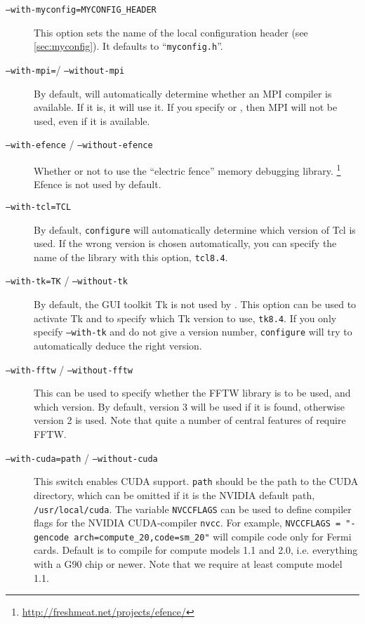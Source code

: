 \begin{description}
\item[\texttt{--with-myconfig=MYCONFIG\_HEADER}] This option sets the
  name of the local configuration header (see \vref{sec:myconfig}). It
  defaults to ``\texttt{myconfig.h}''.
\item[\texttt{--with-mpi=}/ \texttt{--without-mpi}] By default,
   will automatically determine whether an MPI
  compiler is available.  If it is, it will use it.  If you specify
   or , then MPI will
  not be used, even if it is available.
\item[\texttt{--with-efence} / \texttt{--without-efence}] Whether or
  not to use the ``electric fence'' memory debugging library.
  \footnote{\url{http://freshmeat.net/projects/efence/}} Efence is not
  used by default.
\item[\texttt{--with-tcl=TCL}] By default, \texttt{configure} will
  automatically determine which version of Tcl is used.  If the wrong
  version is chosen automatically, you can specify the name of the
  library with this option, \eg \texttt{tcl8.4}.
\item[\texttt{--with-tk=TK} / \texttt{--without-tk}] By default, the
  GUI toolkit Tk is not used by \es. This option can be used to
  activate Tk and to specify which Tk version to use, \eg{}
  \texttt{tk8.4}. If you only specify \texttt{--with-tk} and do not
  give a version number, \texttt{configure} will try to automatically
  deduce the right version.
\item[\texttt{--with-fftw} / \texttt{--without-fftw}] This can
  be used to specify whether the FFTW library is to be used, and which
  version.  By default, version 3 will be used if it is found,
  otherwise version 2 is used.  Note that quite a number of central
  features of \es require FFTW.
\item[\texttt{--with-cuda=path} / \texttt{--without-cuda}] This switch
  enables CUDA support. \texttt{path} should be the path to the CUDA
  directory, which can be omitted if it is the NVIDIA default path,
  \ie \texttt{/usr/local/cuda}. The variable \texttt{NVCCFLAGS} can
  be used to define compiler flags for the NVIDIA CUDA-compiler
  \texttt{nvcc}. For example, \texttt{NVCCFLAGS = "{}-gencode
    arch=compute_20,code=sm_20"{}} will compile code only for Fermi
  cards.  Default is to compile for compute models 1.1 and 2.0,
  i.e. everything with a G90 chip or newer.  Note that we require at
  least compute model 1.1.
\end{description}

